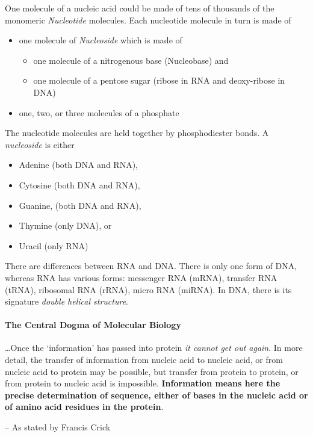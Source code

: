 \documentclass[12pt]{article}
\begin{document}
One molecule of a nucleic acid could be made of tens of thousands of the monomeric \emph{Nucleotide} molecules. Each nucleotide molecule in turn is made of 
\begin{itemize}
    \item one molecule of \emph{Nucleoside} which is made of
        \begin{itemize}
            \item one molecule of a nitrogenous base (Nucleobase) and
            \item one molecule of a pentose sugar (ribose in RNA and deoxy-ribose in DNA)
        \end{itemize}
    \item one, two, or three molecules of a phosphate 
\end{itemize}

The nucleotide molecules are held together by phosphodiester bonds. A \emph{nucleoside} is either
\begin{itemize}
    \item Adenine (both DNA and RNA),
    \item Cytosine (both DNA and RNA),
    \item Guanine, (both DNA and RNA),
    \item Thymine (only DNA), or
    \item Uracil (only RNA)
\end{itemize}

There are differences between RNA and DNA. There is only one form of DNA, whereas RNA has various forms: messenger RNA (mRNA), transfer RNA (tRNA), ribosomal RNA (rRNA), micro RNA (miRNA). In DNA, there is its signature \emph{double helical structure}. 


\paragraph{The Central Dogma of Molecular Biology}
\label{para: central-dogma}
\epigraph
{
    \dots Once the `information' has passed into protein \textit{it cannot get out again}. In more detail, the transfer of information from nucleic acid to nucleic acid, or from nucleic acid to protein may be possible, but transfer from protein to protein, or from protein to nucleic acid is impossible. \textbf{Information means here the precise determination of sequence, either of bases in the nucleic acid or of amino acid residues in the protein}.
}
{
    -- As stated by Francis Crick \cite{the-central-dogma}
}
\end{document}
